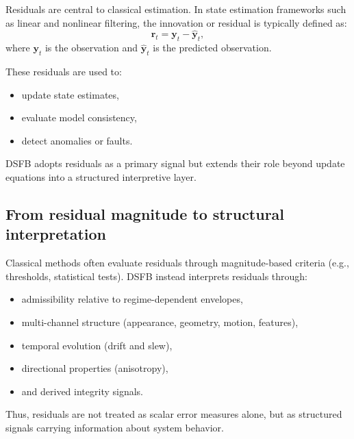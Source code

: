 \documentclass[11pt]{article}
\theoremstyle{definition}
\theoremstyle{plain}
\begin{document}
Residuals are central to classical estimation. In state estimation frameworks such as linear and nonlinear filtering, the innovation or residual is typically defined as:
\begin{equation}
\mathbf{r}_t = \mathbf{y}_t - \hat{\mathbf{y}}_t,
\end{equation}
where $\mathbf{y}_t$ is the observation and $\hat{\mathbf{y}}_t$ is the predicted observation.

These residuals are used to:
\begin{itemize}[leftmargin=1.5em]
    \item update state estimates,
    \item evaluate model consistency,
    \item detect anomalies or faults.
\end{itemize}

DSFB adopts residuals as a primary signal but extends their role beyond update equations into a structured interpretive layer.


\subsection{From residual magnitude to structural interpretation}

Classical methods often evaluate residuals through magnitude-based criteria (e.g., thresholds, statistical tests). DSFB instead interprets residuals through:
\begin{itemize}[leftmargin=1.5em]
    \item admissibility relative to regime-dependent envelopes,
    \item multi-channel structure (appearance, geometry, motion, features),
    \item temporal evolution (drift and slew),
    \item directional properties (anisotropy),
    \item and derived integrity signals.
\end{itemize}

Thus, residuals are not treated as scalar error measures alone, but as structured signals carrying information about system behavior.
\end{document}
